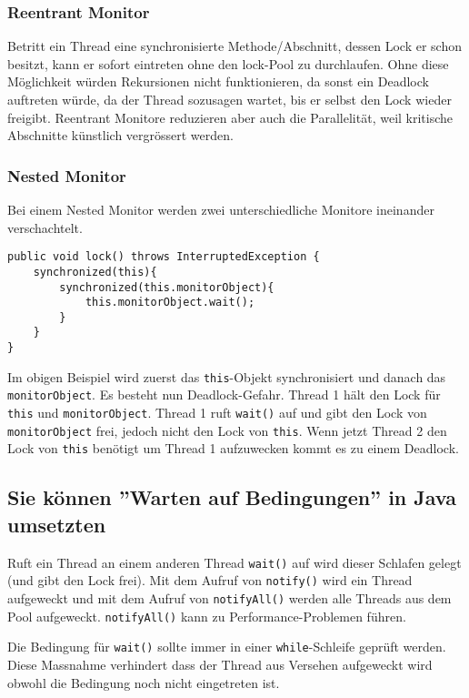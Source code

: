 \subsubsection{Reentrant Monitor}

Betritt ein Thread eine synchronisierte Methode/Abschnitt, dessen Lock er schon besitzt, kann er sofort eintreten ohne den lock-Pool zu durchlaufen. Ohne diese Möglichkeit würden Rekursionen nicht funktionieren, da sonst ein Deadlock auftreten würde, da der Thread sozusagen wartet, bis er selbst den Lock wieder freigibt. 
Reentrant Monitore reduzieren aber auch die Parallelität, weil kritische Abschnitte künstlich vergrössert werden.

\subsubsection{Nested Monitor}

Bei einem Nested Monitor werden zwei unterschiedliche Monitore ineinander verschachtelt.

\begin{lstlisting}[caption={Nested Monitor},label=lst:nested_monitor]
public void lock() throws InterruptedException {
	synchronized(this){
		synchronized(this.monitorObject){
			this.monitorObject.wait();
		}
	}
}	  
\end{lstlisting}

Im obigen Beispiel wird zuerst das \texttt{this}-Objekt synchronisiert und danach das \texttt{monitorObject}. Es besteht nun Deadlock-Gefahr. Thread 1 hält den Lock für \texttt{this} und \texttt{monitorObject}. Thread 1 ruft \texttt{wait()} auf und gibt den Lock von \texttt{monitorObject} frei, jedoch nicht den Lock von \texttt{this}. Wenn jetzt Thread 2 den Lock von \texttt{this} benötigt um Thread 1 aufzuwecken kommt es zu einem Deadlock.

\subsection{Sie können ''Warten auf Bedingungen'' in Java umsetzten}

Ruft ein Thread an einem anderen Thread \texttt{wait()} auf wird dieser Schlafen gelegt (und gibt den Lock frei). Mit dem Aufruf von \texttt{notify()} wird ein Thread aufgeweckt und mit dem Aufruf von \texttt{notifyAll()} werden alle Threads aus dem Pool aufgeweckt. \texttt{notifyAll()} kann zu Performance-Problemen führen. 

Die Bedingung für \texttt{wait()} sollte immer in einer \texttt{while}-Schleife geprüft werden. Diese Massnahme verhindert dass der Thread aus Versehen aufgeweckt wird obwohl die Bedingung noch nicht eingetreten ist. 

